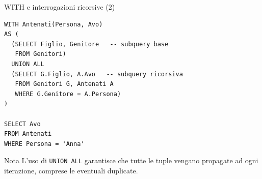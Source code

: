 \documentclass[aspectratio=169]{beamer}
\begin{document}
\begin{frame}[fragile]{WITH e interrogazioni ricorsive (2)}

\begin{lstlisting}
WITH Antenati(Persona, Avo)
AS (
  (SELECT Figlio, Genitore   -- subquery base
   FROM Genitori)
  UNION ALL
  (SELECT G.Figlio, A.Avo   -- subquery ricorsiva
   FROM Genitori G, Antenati A
   WHERE G.Genitore = A.Persona)
)

SELECT Avo
FROM Antenati
WHERE Persona = 'Anna'
\end{lstlisting}

\begin{block}{Nota}
L'uso di \texttt{UNION ALL} garantisce che tutte le tuple vengano propagate ad ogni iterazione, comprese le eventuali duplicate.
\end{block}

\end{frame}
\end{document}
